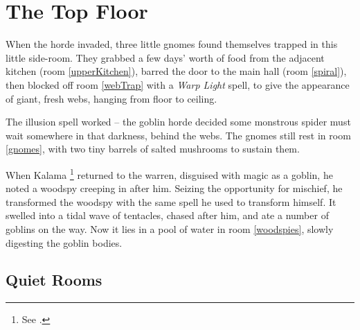 \chapter{The Top Floor}
\epigraph{
  \iftoggle{hardcore}{
    I have township, yet no houses.
    Forests, but no trees.
    Rivers, but no water.
  }{
    Never resting, never still.

    Moving silently from hill to hill.

    It does not walk, run or trot.

    All is cool where it is not.
  }
}{}

\noindent
When the horde invaded, three little gnomes found themselves trapped in this little side-room.
They grabbed a few days' worth of food from the adjacent kitchen (room \ref{upperKitchen}),
barred the door to the main hall (room \ref{spiral}), then blocked off room \ref{webTrap} with a \textit{Warp Light} spell, to give the appearance of giant, fresh webs, hanging from floor to ceiling.

The illusion spell worked -- the goblin horde decided some monstrous spider must wait somewhere in that darkness, behind the webs.
The gnomes still rest in room \ref{gnomes}, with two tiny barrels of salted mushrooms to sustain them.

When Kalama%
\footnote{See .}
returned to the warren, disguised with magic as a goblin, he noted a woodspy%
\iftoggle{hardcore}{}%
{\footnote{Woodspies are giant land-octopuses, which can change their colour and texture to ambush prey.}}
creeping in after him.
Seizing the opportunity for mischief, he transformed the woodspy with the same spell he used to transform himself.
It swelled into a tidal wave of tentacles, chased after him, and ate a number of goblins on the way.
Now it lies in a pool of water in room \ref{woodspies}, slowly digesting the goblin bodies.

\section{Quiet Rooms}
\label{upper}

